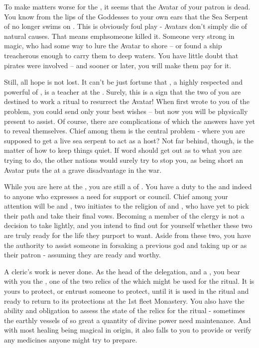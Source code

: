 \documentclass[char]{GL2020}
\begin{document}
To make matters worse for the \pShip{}, it seems that the Avatar of your patron \cFlow{\God} is dead. You know from the lips of the Goddesses to your own ears that the Sea Serpent of \cEbb{} no longer swims on \pEarth{}. This is obviously foul play - Avatars don’t simply die of natural causes. That means emph{someone} killed it. Someone very strong in magic, who had some way to lure the Avatar to shore -- or found a ship treacherous enough to carry them to deep waters. You have little doubt that pirates were involved -- and sooner or later, you will make them pay for it.

Still, all hope is not lost. It can’t be just fortune that \cFlowPriest{}, a highly respected and powerful \cFlowPriest{\cleric} of \cFlow{}, is a teacher at the \pSchool{}. Surely, this is a sign that the two of you are destined to work a ritual to resurrect the Avatar! When \cFlowPriest{} first wrote to you of the problem, you could send only your best wishes -- but now you will be physically present to assist. Of course, there are complications of which the answers have yet to reveal themselves. Chief among them is the central problem - where you are supposed to get a live sea serpent to act as a host? Not far behind, though, is the matter of how to keep things quiet. If word should get out as to what you are trying to do, the other nations would surely try to stop you, as being short an Avatar puts the \pShippies{} at a grave disadvantage in the war. 

While you are here at the \pSc{}, you are still a \cEbbPriest{\cleric} of \cEbb{}. You have a duty to the \pShippies{} and indeed to anyone who expresses a need for support or council. Chief among your attention will be \cInitiate{} and \cWarlordDaughter{}, two initiates to the religion of \cEbb{} and \cFlow{}, who have yet to pick their path and take their final vows. Becoming a member of the clergy is not a decision to take lightly, and you intend to find out for yourself whether these two are truly ready for the life they purport to want. Aside from these two, you have the authority to assist someone in forsaking a previous god and taking up \cEbb{} or \cFlow{} as their patron - assuming they are ready and worthy.

A cleric’s work is never done. As the head of the delegation, and a \cEbbPriest{\cleric}, you bear with you the \iChalice{}, one of the two relics of the \pShip{} which might be used for the ritual. It is yours to protect, or entrust someone to protect, until it is used in the ritual and ready to return to its protections at the 1st fleet Monastery. You also have the ability and obligation to assess the state of the relics for the ritual - sometimes the earthly vessels of so great a quantity of divine power need maintenance. And with most healing being magical in origin, it also falls to you to provide or verify any medicines anyone might try to prepare.
\end{document}
